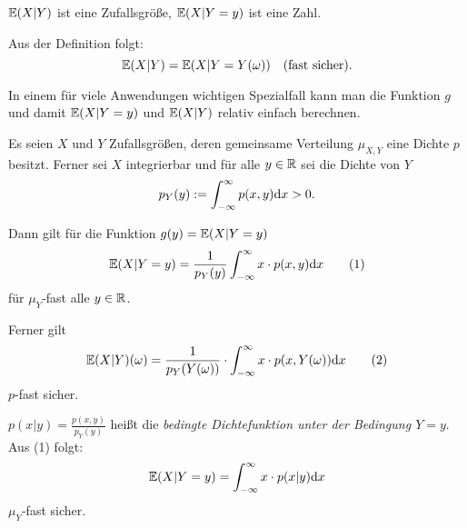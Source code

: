 \begin{rmrk*}
  $\mathbb{E}(X|Y)$ ist eine Zufallsgröße, $\mathbb{E}(X|Y=y)$ ist eine Zahl.
\end{rmrk*}

Aus der Definition folgt:
\[ \mathbb{E}(X|Y) = \mathbb{E}(X | Y = Y(\omega)) \quad (\text{fast sicher}). \]

In einem für viele Anwendungen wichtigen Spezialfall kann man die Funktion $g$
und damit $\mathbb{E}(X|Y = y)$ und $\mathbb{E}(X|Y)$ relativ einfach berechnen.

\begin{thm}
  Es seien $X$ und $Y$ Zufallsgrößen, deren gemeinsame Verteilung $\mu_{X,Y}$
  eine Dichte $p$ besitzt. Ferner sei $X$ integrierbar und für alle $y \in
  \mathbb{R}$ sei die Dichte von $Y$
  \[ p_Y (y) := \int_{-\infty}^\infty p(x,y) \mathrm{d} x > 0. \]

  Dann gilt für die Funktion $g(y) = \mathbb{E}(X|Y=y)$
  \[ \mathbb{E}(X|Y=y) = \frac{1}{p_Y(y)} \int_{-\infty}^\infty x \cdot p(x,y) \mathrm{d} x
    \tag{1} \]
  für $\mu_Y$-fast alle $y \in \mathbb{R}$.

  Ferner gilt
  \[ \mathbb{E}(X|Y)(\omega) = \frac{1}{p_Y(Y(\omega))} \cdot \int_{-\infty}^\infty x
    \cdot p(x,Y(\omega)) \mathrm{d} x \tag{2}\]
  $p$-fast sicher.
\end{thm}

\begin{rmrk*}
  $p(x|y) = \frac{p(x,y)}{p_Y(y)}$ heißt die \emph{bedingte Dichtefunktion unter
    der Bedingung $Y=y$}. Aus (1) folgt:
  \[ \mathbb{E}( X | Y = y ) = \int_{-\infty}^\infty x \cdot p( x | y ) \mathrm{d} x \]
  $\mu_Y$-fast sicher.
\end{rmrk*}

